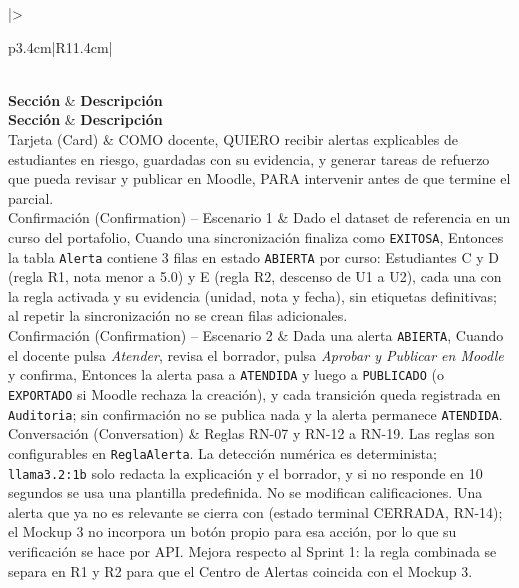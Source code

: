 \documentclass[11pt,a4paper]{article}
\newcommand{\hd}[1]{\textbf{#1}}
\newcommand{\tresc}[5]{%
\begin{longtable}{|>{\bfseries\raggedright\arraybackslash}p{3.4cm}|R{11.4cm}|}
\caption{Ficha de #1: criterios de las 3 Cs}\\
\hline \hd{Sección} & \hd{Descripción}\\ \hline \endfirsthead
\hline \hd{Sección} & \hd{Descripción}\\ \hline \endhead
Tarjeta (Card) & #2\\ \hline
Confirmación (Confirmation) -- Escenario 1 & #3\\ \hline
Confirmación (Confirmation) -- Escenario 2 & #4\\ \hline
Conversación (Conversation) & #5\\ \hline
\end{longtable}}
\begin{document}
\tresc{HU-05}
{COMO docente, QUIERO recibir alertas explicables de estudiantes en riesgo, guardadas con su evidencia, y generar tareas de refuerzo que pueda revisar y publicar en Moodle, PARA intervenir antes de que termine el parcial.}
{Dado el dataset de referencia en un curso del portafolio, Cuando una sincronización finaliza como \texttt{EXITOSA}, Entonces la tabla \texttt{Alerta} contiene 3 filas en estado \texttt{ABIERTA} por curso: Estudiantes C y D (regla R1, nota menor a 5.0) y E (regla R2, descenso de U1 a U2), cada una con la regla activada y su evidencia (unidad, nota y fecha), sin etiquetas definitivas; al repetir la sincronización no se crean filas adicionales.}
{Dada una alerta \texttt{ABIERTA}, Cuando el docente pulsa \emph{Atender}, revisa el borrador, pulsa \emph{Aprobar y Publicar en Moodle} y confirma, Entonces la alerta pasa a \texttt{ATENDIDA} y luego a \texttt{PUBLICADO} (o \texttt{EXPORTADO} si Moodle rechaza la creación), y cada transición queda registrada en \texttt{Auditoria}; sin confirmación no se publica nada y la alerta permanece \texttt{ATENDIDA}.}
{Reglas RN-07 y RN-12 a RN-19. Las reglas son configurables en \texttt{ReglaAlerta}. La detección numérica es determinista; \texttt{llama3.2:1b} solo redacta la explicación y el borrador, y si no responde en 10 segundos se usa una plantilla predefinida. No se modifican calificaciones. Una alerta que ya no es relevante se cierra con \cd{PATCH /api/alertas/{id}/cerrar} (estado terminal CERRADA, RN-14); el Mockup 3 no incorpora un botón propio para esa acción, por lo que su verificación se hace por API. Mejora respecto al Sprint 1: la regla combinada se separa en R1 y R2 para que el Centro de Alertas coincida con el Mockup 3.}
\end{document}

